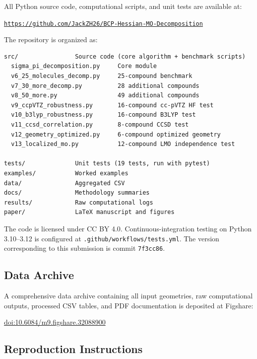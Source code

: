\documentclass[11pt,a4paper]{article}
\begin{document}
All Python source code, computational scripts, and unit tests are
available at:
\begin{center}
\href{https://github.com/JackZH26/BCP-Hessian-MO-Decomposition}
{\texttt{https://github.com/JackZH26/BCP-Hessian-MO-Decomposition}}
\end{center}
The repository is organized as:
\begin{verbatim}
src/                Source code (core algorithm + benchmark scripts)
  sigma_pi_decomposition.py     Core module
  v6_25_molecules_decomp.py     25-compound benchmark
  v7_30_more_decomp.py          28 additional compounds
  v8_50_more.py                 49 additional compounds
  v9_ccpVTZ_robustness.py       16-compound cc-pVTZ HF test
  v10_b3lyp_robustness.py       16-compound B3LYP test
  v11_ccsd_correlation.py       8-compound CCSD test
  v12_geometry_optimized.py     6-compound optimized geometry
  v13_localized_mo.py           12-compound LMO independence test

tests/              Unit tests (19 tests, run with pytest)
examples/           Worked examples
data/               Aggregated CSV
docs/               Methodology summaries
results/            Raw computational logs
paper/              LaTeX manuscript and figures
\end{verbatim}
The code is licensed under CC BY 4.0. Continuous-integration testing
on Python 3.10--3.12 is configured at \texttt{.github/workflows/tests.yml}.
The version corresponding to this submission is commit \texttt{7f3cc86}.

\subsection{Data Archive}

A comprehensive data archive containing all input geometries, raw
computational outputs, processed CSV tables, and PDF documentation
is deposited at Figshare:
\begin{center}
\href{https://doi.org/10.6084/m9.figshare.32088900}
{doi:10.6084/m9.figshare.32088900}
\end{center}

\subsection{Reproduction Instructions}
\end{document}
